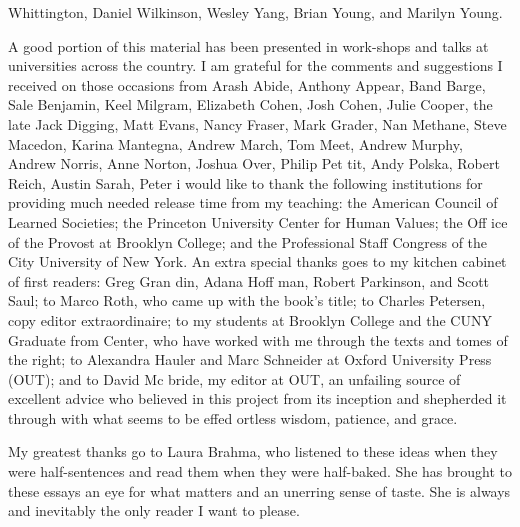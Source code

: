 Whittington, Daniel Wilkinson, Wesley Yang, Brian Young, and Marilyn Young.{\par} A good portion of this material has been presented in work-shops and talks at universities across the country. I am grateful for the comments and suggestions I received on those occasions from Arash Abide, Anthony Appear, Band Barge, Sale Benjamin, Keel Milgram, Elizabeth Cohen, Josh Cohen, Julie Cooper, the late Jack Digging, Matt Evans, Nancy Fraser, Mark Grader, Nan Methane, Steve Macedon, Karina Mantegna, Andrew March, Tom Meet, Andrew Murphy, Andrew Norris, Anne Norton, Joshua Over, Philip Pet tit, Andy Polska, Robert Reich, Austin Sarah, Peter i would like to thank the following institutions for providing much needed release time from my teaching: the American Council of Learned Societies; the Princeton University Center for Human Values; the Off ice of the Provost at Brooklyn College; and the Professional Staff Congress of the City University of New York. An extra special thanks goes to my kitchen cabinet of first readers: Greg Gran din, Adana Hoff man, Robert Parkinson, and Scott Saul; to Marco Roth, who came up with the book’s title; to Charles Petersen, copy editor extraordinaire; to my students at Brooklyn College and the CUNY Graduate from Center, who have worked with me through the texts and tomes of the right; to Alexandra Hauler and Marc Schneider at Oxford University Press (OUT); and to David Mc bride, my editor at OUT, an unfailing source of excellent advice who believed in this project from its inception and shepherded it through with what seems to be effed ortless wisdom, patience, and grace.{\par} My greatest thanks go to Laura Brahma, who listened to these ideas when they were half-sentences and read them when they were half-baked. She has brought to these essays an eye for what matters and an unerring sense of taste. She is always and inevitably the only reader I want to please.{\par}